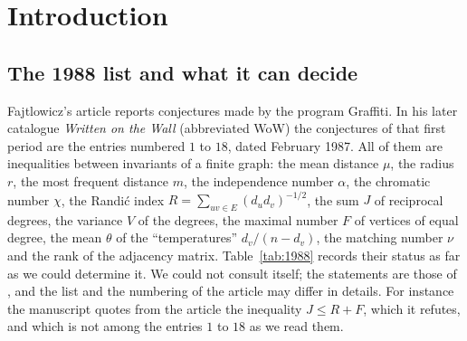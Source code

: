 \documentclass[11pt]{amsart}
\theoremstyle{definition}
\theoremstyle{remark}
\begin{document}
\maketitle

\section{Introduction}

\subsection{The 1988 list and what it can decide}
Fajtlowicz's article \cite{Faj88} reports conjectures made by the program Graffiti. In his later catalogue \emph{Written on the Wall} \cite{WOW} (abbreviated WoW) the conjectures of that first period are the entries numbered $1$ to $18$, dated February 1987. All of them are inequalities between invariants of a finite graph: the mean distance $\mu$, the radius $r$, the most frequent distance $m$, the independence number $\alpha$, the chromatic number $\chi$, the Randi\'c index $R=\sum_{uv\in E}(d_ud_v)^{-1/2}$, the sum $J$ of reciprocal degrees, the variance $V$ of the degrees, the maximal number $F$ of vertices of equal degree, the mean $\theta$ of the ``temperatures'' $d_v/(n-d_v)$, the matching number $\nu$ and the rank of the adjacency matrix. Table~\ref{tab:1988} records their status as far as we could determine it. We could not consult \cite{Faj88} itself; the statements are those of \cite{WOW}, and the list and the numbering of the article may differ in details. For instance the manuscript \cite{V243} quotes from the article the inequality $J\le R+F$, which it refutes, and which is not among the entries $1$ to $18$ as we read them.
\end{document}
